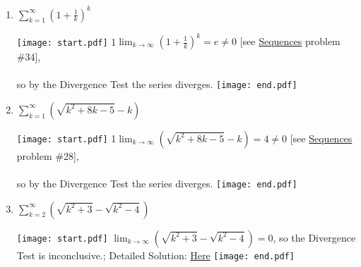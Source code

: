 \documentclass[12pt]{article}
\begin{document}
\begin{enumerate}
\item $\sum_{k=1}^{\infty}\left(1+\frac{1}{k}\right)^k$

\texttt{[image: start.pdf]}
{{{1\linewidth}{$\lim_{k \rightarrow \infty}\left(1+\frac{1}{k}\right)^k=e\neq0$ [see \underline{Sequences} problem \#34], \\ \\ so by the Divergence Test the series diverges.}}}
\texttt{[image: end.pdf]}


\item $\sum_{k=1}^{\infty}(\sqrt{k^2+8k-5}-k)$

\texttt{[image: start.pdf]}
{{{1\linewidth}{$\lim_{k \rightarrow \infty}(\sqrt{k^2+8k-5}-k)=4\neq0$ [see \underline{Sequences} problem \#28], \\ \\ so by the Divergence Test the series diverges.}}}
\texttt{[image: end.pdf]}


\item $\sum_{k=2}^{\infty}(\sqrt{k^2+3}-\sqrt{k^2-4})$

\texttt{[image: start.pdf]}
{{$\lim_{k \rightarrow \infty}(\sqrt{k^2+3}-\sqrt{k^2-4})=0$, so the Divergence Test is inconclusive.; Detailed Solution: \textcolor{blue}{\href{http://www.math.drexel.edu/classes/Calculus/resources/Math123HW/Solutions/123_08_Convergence_Tests_09.pdf}{Here}}}}
\texttt{[image: end.pdf]}



\end{enumerate}

\end{document}
